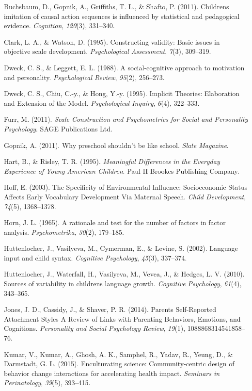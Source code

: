 \documentclass[10pt, letterpaper]{article}
\begin{document}
Buchsbaum, D., Gopnik, A., Griffiths, T. L., \& Shafto, P. (2011).
Childrens imitation of causal action sequences is influenced by
statistical and pedagogical evidence. \emph{Cognition}, \emph{120}(3),
331--340.

Clark, L. A., \& Watson, D. (1995). Constructing validity: Basic issues
in objective scale development. \emph{Psychological Assessment},
\emph{7}(3), 309--319.

Dweck, C. S., \& Leggett, E. L. (1988). A social-cognitive approach to
motivation and personality. \emph{Psychological Review}, \emph{95}(2),
256--273.

Dweck, C. S., Chiu, C.-y., \& Hong, Y.-y. (1995). Implicit Theories:
Elaboration and Extension of the Model. \emph{Psychological Inquiry},
\emph{6}(4), 322--333.

Furr, M. (2011). \emph{Scale Construction and Psychometrics for Social
and Personality Psychology}. SAGE Publications Ltd.

Gopnik, A. (2011). Why preschool shouldn't be like school. \emph{Slate
Magazine}.

Hart, B., \& Risley, T. R. (1995). \emph{Meaningful Differences in the
Everyday Experience of Young American Children}. Paul H Brookes
Publishing Company.

Hoff, E. (2003). The Specificity of Environmental Influence:
Socioeconomic Status Affects Early Vocabulary Development Via Maternal
Speech. \emph{Child Development}, \emph{74}(5), 1368--1378.

Horn, J. L. (1965). A rationale and test for the number of factors in
factor analysis. \emph{Psychometrika}, \emph{30}(2), 179--185.

Huttenlocher, J., Vasilyeva, M., Cymerman, E., \& Levine, S. (2002).
Language input and child syntax. \emph{Cognitive Psychology},
\emph{45}(3), 337--374.

Huttenlocher, J., Waterfall, H., Vasilyeva, M., Vevea, J., \& Hedges, L.
V. (2010). Sources of variability in childrens language growth.
\emph{Cognitive Psychology}, \emph{61}(4), 343--365.

Jones, J. D., Cassidy, J., \& Shaver, P. R. (2014). Parents
Self-Reported Attachment Styles A Review of Links with Parenting
Behaviors, Emotions, and Cognitions. \emph{Personality and Social
Psychology Review}, \emph{19}(1), 1088868314541858--76.

Kumar, V., Kumar, A., Ghosh, A. K., Samphel, R., Yadav, R., Yeung, D.,
\& Darmstadt, G. L. (2015). Enculturating science: Community-centric
design of behavior change interactions for accelerating health impact.
\emph{Seminars in Perinatology}, \emph{39}(5), 393--415.
\end{document}
